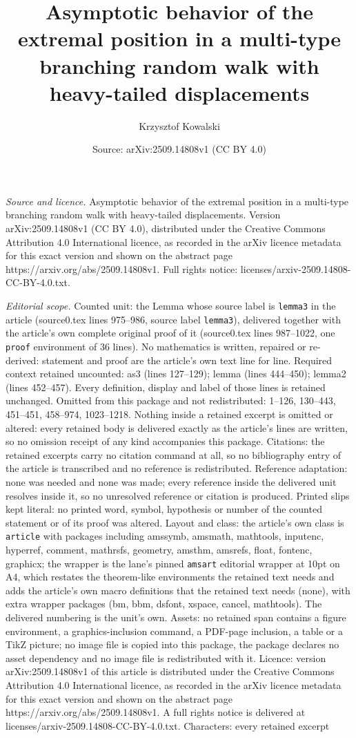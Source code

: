 \documentclass[10pt,a4paper]{amsart}
\title[Asymptotic behavior of the extremal position in a multi-type]{Asymptotic behavior of the extremal position in a multi-type branching random walk with heavy-tailed displacements}
\author{Krzysztof Kowalski}
\date{Source: arXiv:2509.14808v1 (CC BY 4.0)}
\begin{document}
\maketitle

\noindent\emph{Source and licence.} Asymptotic behavior of the extremal position in a multi-type branching random walk with heavy-tailed displacements. Version arXiv:2509.14808v1 (CC BY 4.0), distributed under the Creative Commons Attribution 4.0 International licence, as recorded in the arXiv licence metadata for this exact version and shown on the abstract page https://arxiv.org/abs/2509.14808v1. Full rights notice: licenses/arxiv-2509.14808-CC-BY-4.0.txt.\par\smallskip

\noindent\textit{Editorial scope.} Counted unit: the Lemma whose source label is \texttt{lemma3} in the article (source0.tex lines 975--986, source label \texttt{lemma3}), delivered together with the article's own complete original proof of it (source0.tex lines 987--1022, one \texttt{proof} environment of 36 lines). No mathematics is written, repaired or re-derived: statement and proof are the article's own text line for line. Required context retained uncounted: as3 (lines 127--129); lemma (lines 444--450); lemma2 (lines 452--457). Every definition, display and label of those lines is retained unchanged. Omitted from this package and not redistributed: 1--126, 130--443, 451--451, 458--974, 1023--1218. Nothing inside a retained excerpt is omitted or altered: every retained body is delivered exactly as the article's lines are written, so no omission receipt of any kind accompanies this package. Citations: the retained excerpts carry no citation command at all, so no bibliography entry of the article is transcribed and no reference is redistributed. Reference adaptation: none was needed and none was made; every reference inside the delivered unit resolves inside it, so no unresolved reference or citation is produced. Printed slips kept literal: no printed word, symbol, hypothesis or number of the counted statement or of its proof was altered. Layout and class: the article's own class is \texttt{article} with packages including amssymb, amsmath, mathtools, inputenc, hyperref, comment, mathrsfs, geometry, amsthm, amsrefs, float, fontenc, graphicx; the wrapper is the lane's pinned \texttt{amsart} editorial wrapper at 10pt on A4, which restates the theorem-like environments the retained text needs and adds the article's own macro definitions that the retained text needs (none), with extra wrapper packages (bm, bbm, dsfont, xspace, cancel, mathtools). The delivered numbering is the unit's own. Assets: no retained span contains a figure environment, a graphics-inclusion command, a PDF-page inclusion, a table or a TikZ picture; no image file is copied into this package, the package declares no asset dependency and no image file is redistributed with it. Licence: version arXiv:2509.14808v1 of this article is distributed under the Creative Commons Attribution 4.0 International licence, as recorded in the arXiv licence metadata for this exact version and shown on the abstract page https://arxiv.org/abs/2509.14808v1. A full rights notice is delivered at licenses/arxiv-2509.14808-CC-BY-4.0.txt. Characters: every retained excerpt 
\end{document}
